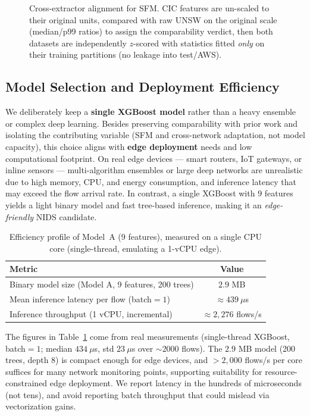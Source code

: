 \documentclass[preprint,12pt,authoryear]{elsarticle}
\begin{document}
\begin{figure}[h]
\centering
\resizebox{0.95\linewidth}{!}{}
\caption{Cross-extractor alignment for SFM. CIC features are un-scaled to their
original units, compared with raw UNSW on the original scale (median/p99 ratios) to
assign the comparability verdict, then both datasets are independently
$z$-scored with statistics fitted \emph{only} on their training partitions
(no leakage into test/AWS).}
\label{fig:unscaling}
\end{figure}

\subsection{Model Selection and Deployment Efficiency}
\label{sec:edge}
We deliberately keep a \textbf{single XGBoost model} rather than a heavy ensemble
or complex deep learning. Besides preserving comparability with prior work and
isolating the contributing variable (SFM and cross-network adaptation, not model
capacity), this choice aligns with \textbf{edge deployment} needs and low
computational footprint. On real edge devices --- smart routers, IoT
gateways, or inline sensors --- multi-algorithm ensembles or large deep networks
are unrealistic due to high memory, CPU, and energy consumption, and inference
latency that may exceed the flow arrival rate. In contrast, a single XGBoost with
$9$ features yields a light binary model and fast tree-based inference, making it
an \emph{edge-friendly} NIDS candidate.

\begin{table}[h]
\centering
\caption{Efficiency profile of Model~A (9 features), measured on a single CPU
core (single-thread, emulating a 1-vCPU edge).}
\label{tab:efficiency}
\begin{tabular}{lc}
\toprule
Metric & Value \\
\midrule
Binary model size (Model A, 9 features, 200 trees) & $2.9$ MB \\
Mean inference latency per flow (batch$=1$) & $\approx 439\ \mu$s \\
Inference throughput (1 vCPU, incremental) & $\approx 2{,}276$ flows/s \\
\bottomrule
\end{tabular}
\end{table}

\noindent The figures in Table~\ref{tab:efficiency} come from real measurements
(single-thread XGBoost, batch$=1$; median $434\ \mu$s, std $23\ \mu$s over
$\sim$2000 flows). The $2.9$ MB model (200 trees, depth 8) is compact enough for
edge devices, and $>2{,}000$ flows/s per core suffices for many network monitoring
points, supporting suitability for resource-constrained edge deployment. We report
latency in the hundreds of microseconds (not tens), and avoid reporting batch
throughput that could mislead via vectorization gains.
\end{document}
